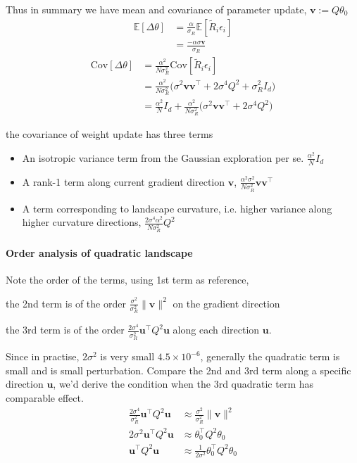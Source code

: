     Thus in summary we have mean and covariance of parameter update, $\mathbf{v}:=Q\theta_{0}$
    \begin{align*}
    \mathbb{E}[\Delta\theta] & =\frac{\alpha}{\sigma_{R}}\mathbb{E}[\tilde{R}_{i}\epsilon_{i}]\\
     & =\frac{-\alpha\sigma\mathbf{v}}{\sigma_{R}}
    \end{align*}
    \begin{align*}
    \mathrm{Cov}[\Delta\theta] & =\frac{\alpha^{2}}{N\sigma_{R}^{2}}\mathrm{Cov}[\tilde{R}_{i}\epsilon_{i}]\\
     & =\frac{\alpha^{2}}{N\sigma_{R}^{2}}\Big(\sigma^{2}\mathbf{v}\mathbf{v}^{\top}+2\sigma^{4}Q^{2}+\sigma_{R}^{2}I_{d}\Big)\\
     & =\frac{\alpha^{2}}{N}I_{d}+\frac{\alpha^{2}}{N\sigma_{R}^{2}}\Big(\sigma^{2}\mathbf{v}\mathbf{v}^{\top}+2\sigma^{4}Q^{2}\Big)
    \end{align*}
    
    the covariance of weight update has three terms 
    \begin{itemize}
    \item An isotropic variance term from the Gaussian exploration per se. $\frac{\alpha^{2}}{N}I_{d}$
    \item A rank-1 term along current gradient direction $\mathbf{v}$, $\frac{\alpha^{2}\sigma^{2}}{N\sigma_{R}^{2}}\mathbf{v}\mathbf{v}^{\top}$
    \item A term corresponding to landscape curvature, i.e. higher variance
    along higher curvature directions, $\frac{2\sigma^{4}\alpha^{2}}{N\sigma_{R}^{2}}Q^{2}$
    \end{itemize}
    
    \paragraph{Order analysis of quadratic landscape }
    
    Note the order of the terms, using 1st term as reference,
    
    the 2nd term is of the order $\frac{\sigma^{2}}{\sigma_{R}^{2}}\|\mathbf{v}\|^{2}$
    on the gradient direction 
    
    the 3rd term is of the order $\frac{2\sigma^{4}}{\sigma_{R}^{2}}\mathbf{u}^{\top}Q^{2}\mathbf{u}$
    along each direction $\mathbf{u}$. 
    
    Since in practise, $2\sigma^{2}$ is very small $4.5\times10^{-6}$,
    generally the quadratic term is small and is small perturbation. Compare
    the 2nd and 3rd term along a specific direction $\mathbf{u}$, we'd
    derive the condition when the 3rd quadratic term has comparable effect.
    \begin{align*}
    \frac{2\sigma^{4}}{\sigma_{R}^{2}}\mathbf{u}^{\top}Q^{2}\mathbf{u} & \approx\frac{\sigma^{2}}{\sigma_{R}^{2}}\|\mathbf{v}\|^{2}\\
    2\sigma^{2}\mathbf{u}^{\top}Q^{2}\mathbf{u} & \approx\theta_{0}^{\top}Q^{2}\theta_{0}\\
    \mathbf{u}^{\top}Q^{2}\mathbf{u} & \approx\frac{1}{2\sigma^{2}}\theta_{0}^{\top}Q^{2}\theta_{0}
    \end{align*}
    
